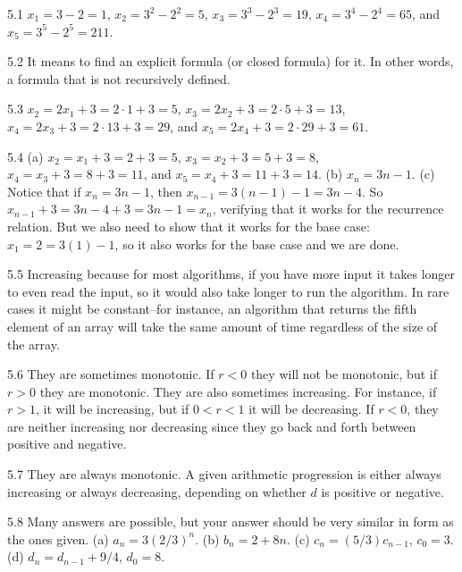 \begin{RequAnswer}{5.1}
$x_1=3-2=1$, $x_2=3^2-2^2=5$, $x_3=3^3-2^3=19$, $x_4=3^4-2^4=65$, and $x_5=3^5-2^5=211$.
\end{RequAnswer}
\begin{RequAnswer}{5.2}
It means to find an explicit formula (or closed formula) for it.
In other words, a formula that is not recursively defined.
\end{RequAnswer}
\begin{RequAnswer}{5.3}
$x_2=2 x_1+3 = 2\cdot 1+3=5$, $x_3=2 x_2+3 = 2\cdot 5+3=13$, $x_4=2 x_3+3=2\cdot 13+3=29$,
and $x_5=2 x_4+3=2\cdot 29+3=61$.
\end{RequAnswer}
\begin{RequAnswer}{5.4}
(a) $x_2=x_1+3 = 2+3=5$, $x_3=x_2+3 = 5+3=8$, $x_4=x_3+3=8+3=11$, and $x_5=x_4+3=11+3=14$.
(b) $x_n=3n-1$.
(c) Notice that if $x_n=3n-1$, then $x_{n-1}=3(n-1)-1=3n-4$. So
$x_{n-1}+3 = 3n-4+3=3n-1=x_n$, verifying that it works for the recurrence relation.
But we also need to show that it works for the base case: $x_1=2=3(1)-1$, so it also works for the base case and we
are done.
\end{RequAnswer}
\begin{RequAnswer}{5.5}
Increasing because for most algorithms, if you have more input it takes longer to even read the input, so it
would also take longer to run the algorithm. In rare cases it might be constant--for instance, an algorithm that
returns the fifth element of an array will take the same amount of time regardless of the size of the array.
\end{RequAnswer}
\begin{RequAnswer}{5.6}
They are sometimes monotonic. If $r<0$ they will not be monotonic, but if $r>0$ they are monotonic.
They are also sometimes increasing. For instance, if $r>1$, it will be increasing, but if
$0<r<1$ it will be decreasing. If $r<0$, they are neither increasing nor decreasing since they
go back and forth between positive and negative.
\end{RequAnswer}
\begin{RequAnswer}{5.7}
They are always monotonic. A given arithmetic progression is either always increasing or always decreasing,
depending on whether $d$ is positive or negative.
\end{RequAnswer}
\begin{RequAnswer}{5.8}
Many answers are possible, but your answer should be very similar in form as the ones given.
(a) $a_n=3(2/3)^n$.
(b) $b_n=2+8n$.
(c) $c_n=(5/3)c_{n-1}$, $c_0=3$.
(d) $d_n=d_{n-1}+9/4$, $d_0=8$.
\end{RequAnswer}
